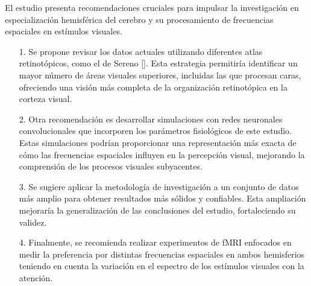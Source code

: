 \begin{recomendations}
    El estudio presenta recomendaciones cruciales para impulsar la investigación en especialización hemisférica del cerebro y su procesamiento de frecuencias espaciales en est\'imulos visuales.  
     \begin{itemize}
     	
     	\item [1.] Se propone revisar los datos actuales utilizando diferentes atlas retinotópicos, como el de Sereno [\cite{sereno_topological_2022}]. Esta estrategia permitiría identificar un mayor número de áreas visuales superiores, incluidas las que procesan caras, ofreciendo una visión más completa de la organización retinotópica en la corteza visual.
     	
     	\item [2.] Otra recomendación es desarrollar simulaciones con redes neuronales convolucionales que incorporen los parámetros fisiológicos de este estudio. Estas simulaciones podrían proporcionar una representación más exacta de cómo las frecuencias espaciales  influyen en la percepción visual, mejorando la comprensión de los procesos visuales subyacentes.
     	
     	\item[3.] Se sugiere aplicar la metodología de investigación a un conjunto de datos más amplio para obtener resultados más sólidos y confiables. Esta ampliación mejoraría la generalización de las conclusiones del estudio, fortaleciendo su validez.
     	
     	\item[4.] Finalmente, se recomienda realizar experimentos de fMRI enfocados en medir la preferencia por distintas frecuencias espaciales en ambos hemisferios teniendo en cuenta la variación en el espectro de los estímulos visuales con la atenci\'on. 
     	
     \end{itemize}
   
    
    
    
    
    
   
\end{recomendations}
